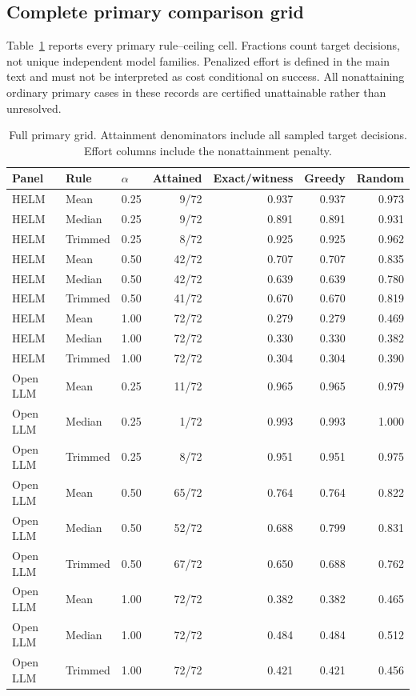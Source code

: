 \documentclass{article}
\begin{document}
\subsection{Complete primary comparison grid}
Table~\ref{tab:grid} reports every primary rule--ceiling cell. Fractions count target decisions, not unique independent model families. Penalized effort is defined in the main text and must not be interpreted as cost conditional on success. All nonattaining ordinary primary cases in these records are certified unattainable rather than unresolved.
\begin{table}[h]
\centering
\caption{Full primary grid. Attainment denominators include all sampled target decisions. Effort columns include the nonattainment penalty.}
\label{tab:grid}
\begin{tabular}{lllrrrr}
\toprule
Panel & Rule & $\alpha$ & Attained & Exact/witness & Greedy & Random\\
\midrule
HELM & Mean & 0.25 & 9/72 & 0.937 & 0.937 & 0.973 \\
HELM & Median & 0.25 & 9/72 & 0.891 & 0.891 & 0.931 \\
HELM & Trimmed & 0.25 & 8/72 & 0.925 & 0.925 & 0.962 \\
HELM & Mean & 0.50 & 42/72 & 0.707 & 0.707 & 0.835 \\
HELM & Median & 0.50 & 42/72 & 0.639 & 0.639 & 0.780 \\
HELM & Trimmed & 0.50 & 41/72 & 0.670 & 0.670 & 0.819 \\
HELM & Mean & 1.00 & 72/72 & 0.279 & 0.279 & 0.469 \\
HELM & Median & 1.00 & 72/72 & 0.330 & 0.330 & 0.382 \\
HELM & Trimmed & 1.00 & 72/72 & 0.304 & 0.304 & 0.390 \\
Open LLM & Mean & 0.25 & 11/72 & 0.965 & 0.965 & 0.979 \\
Open LLM & Median & 0.25 & 1/72 & 0.993 & 0.993 & 1.000 \\
Open LLM & Trimmed & 0.25 & 8/72 & 0.951 & 0.951 & 0.975 \\
Open LLM & Mean & 0.50 & 65/72 & 0.764 & 0.764 & 0.822 \\
Open LLM & Median & 0.50 & 52/72 & 0.688 & 0.799 & 0.831 \\
Open LLM & Trimmed & 0.50 & 67/72 & 0.650 & 0.688 & 0.762 \\
Open LLM & Mean & 1.00 & 72/72 & 0.382 & 0.382 & 0.465 \\
Open LLM & Median & 1.00 & 72/72 & 0.484 & 0.484 & 0.512 \\
Open LLM & Trimmed & 1.00 & 72/72 & 0.421 & 0.421 & 0.456 \\
\bottomrule
\end{tabular}
\end{table}
\end{document}

